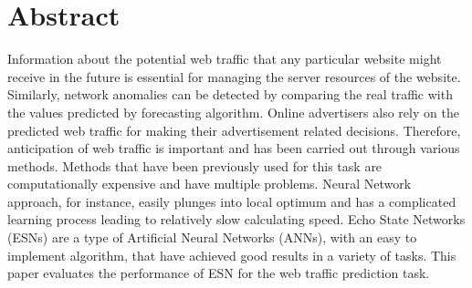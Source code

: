   \newpage  \section*{Abstract}  Information about the potential web traffic that any particular website might receive in the future is essential for managing the server resources of the website. Similarly, network anomalies can be detected by comparing the real traffic with the values predicted by forecasting algorithm.  Online advertisers also rely on the predicted web traffic for making their advertisement related decisions. Therefore, anticipation of web traffic is important and has been carried out through various methods. Methods that have been previously used for this task are computationally expensive and have multiple problems. Neural Network approach, for instance, easily plunges into local optimum and has a complicated learning process leading to relatively slow calculating speed. Echo State Networks (ESNs) are a type of Artificial Neural Networks (ANNs), with an easy to implement algorithm, that have achieved good results in a variety of tasks.  This paper evaluates the performance of ESN for the web traffic prediction task.
